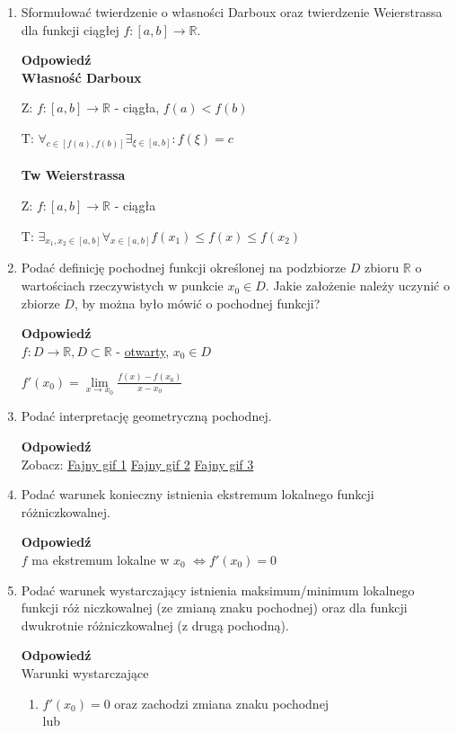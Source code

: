\documentclass[12pt,a4paper]{article}
\newcounter{twierdzenie}
\theoremstyle{break}
\newcommand{\Odp}[1]{
		\begin{mdframed}[style=zadanie]
			\textbf{Odpowiedź}\\
			#1
		\end{mdframed}
	}
\begin{document}
\begin{enumerate}[1.]
	\item Sformułować twierdzenie o własności Darboux oraz twierdzenie Weierstrassa dla funkcji ciągłej $f : [a, b] \rightarrow \mathbb{R}$.
	\Odp{
		\textbf{Własność Darboux}
		
		Z: $f:[a,b]\rightarrow \mathbb{R}$ - ciągła, $f(a)<f(b)$
		
		T: $\forall_{c\in [f(a),f(b)]} \exists_{\xi\in [a,b]} : f(\xi)=c$
		\\\\
		\textbf{Tw Weierstrassa}
		
		Z: $f:[a,b]\rightarrow \mathbb{R}$ - ciągła
		
		T: $\exists_{x_1,x_2 \in [a,b]} \forall_{x\in[a,b]} f(x_1)\leq f(x)\leq f(x_2)$
	}
	
	\item Podać definicję pochodnej funkcji określonej na podzbiorze $D$ zbioru $\mathbb{R}$ o wartościach rzeczywistych w punkcie $x_0 \in D$. Jakie założenie należy uczynić o zbiorze $D$, by można było mówić o pochodnej funkcji?
	\Odp{
		$f:D\rightarrow \mathbb{R}, D\subset \mathbb{R}$ - \underline{otwarty}, $x_0\in D$
		
		$f'(x_0)=\lim\limits_{x\rightarrow x_0} \frac{f(x)-f(x_0)}{x-x_0}$
		
		
	}
	
	\item Podać interpretację geometryczną pochodnej.
	\Odp{
		Zobacz: \href{https://tenor.com/view/limite-math-y-axis-x-axis-calculus-gif-14990687}{Fajny gif 1}\hspace{1cm}
		\href{https://tenor.com/view/derivative-gif-23137892}{Fajny gif 2}\hspace{1cm}
		\href{https://tenor.com/view/derivada-gif-22383091}{Fajny gif 3}
	}
	\newpage
	\item Podać warunek konieczny istnienia ekstremum lokalnego funkcji różniczkowalnej.
	\Odp{
		$f$ ma ekstremum lokalne w $x_0$ $\Leftrightarrow f'(x_0)=0$ 
	}
	
	\item Podać warunek wystarczający istnienia maksimum/minimum lokalnego funkcji róż	niczkowalnej (ze zmianą znaku pochodnej) oraz dla funkcji dwukrotnie różniczkowalnej (z drugą pochodną).
	\Odp{
		Warunki wystarczające
		\begin{enumerate}[1)]
			\item $f'(x_0)=0$ oraz zachodzi zmiana znaku pochodnej\\
		
			lub\\
			

\end{enumerate}}
\end{enumerate}
\end{document}

